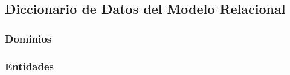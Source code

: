 \documentclass[12pt]{article}
\begin{document}
{\begin{landscape}
    \subsection{Diccionario de Datos del Modelo Relacional}
    
    \subsubsection{Dominios}
    \begin{center}
        
    \end{center}
    
    \subsubsection{Entidades}
    \begin{center}
        
    \end{center}
    
    \end{landscape}
}
\end{document}

